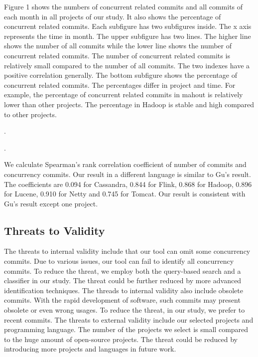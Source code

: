 Figure 1 shows the numbers of concurrent related commits and all commits of each month in all projects of our study. It also shows the percentage of concurrent related commits. Each subfigure has two subfigures inside. The x axis represents the time in month. The upper subfigure has two lines. The higher line shows the number of all commits while the lower line shows the number of concurrent related commits. The number of concurrent related commits is relatively small compared to the number of all commits. The two indexes have a positive correlation generally. The bottom subfigure shows the percentage of concurrent related commits. The percentages differ in project and time. For example, the percentage of concurrent related commits in mahout is relatively lower than other projects. The percentage in Hadoop is stable and high compared to other projects.


.

.

We calculate Spearman's rank correlation coefficient of number of commits and concurrency commits. Our result in a different language is similar to Gu's result. The coefficients are 0.094 for Cassandra, 0.844 for Flink, 0.868 for Hadoop, 0.896 for Lucene, 0.910 for Netty and 0.745 for Tomcat. Our result is consistent with Gu's result except one project.


\subsection{Threats to Validity}

The threats to internal validity include that our tool can omit some concurrency commits. Due to various issues, our tool can fail to identify all concurrency commits. To reduce the threat, we employ both the query-based search and a classifier in our study. The threat could be further reduced by more advanced identification techniques. The threads to internal validity also include obsolete commits. With the rapid development of software, such commits may present obsolete or even wrong usages. To reduce the threat, in our study, we prefer to recent commits. The threats to external validity include our selected projects and programming language. The number of the projects we select is small compared to the huge amount of open-source projects. The threat could be reduced by introducing more projects and languages in future work.

